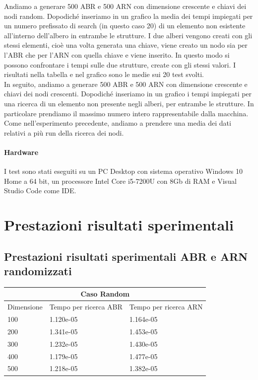 \documentclass[12pt]{article}
\begin{document}
Andiamo a generare 500 ABR e 500 ARN con dimensione crescente e chiavi dei nodi random.
Dopodiché inseriamo in un grafico la media dei tempi impiegati per un numero prefissato di search (in questo caso 20) di un elemento non esistente all'interno dell'albero in entrambe le strutture.
I due alberi vengono creati con gli stessi elementi, cioè una volta generata una chiave, viene creato un nodo sia per l'ABR che per l'ARN con quella chiave e viene inserito.
In questo modo si possono confrontare i tempi sulle due strutture, create con gli stessi valori.
I risultati nella tabella e nel grafico sono le medie sui 20 test svolti.\\
In seguito, andiamo a generare 500 ABR e 500 ARN con dimensione crescente e chiavi dei nodi crescenti.
Dopodiché inseriamo in un grafico i tempi impiegati per una ricerca di un elemento non presente negli alberi, per entrambe le strutture. In particolare prendiamo il massimo numero intero rappresentabile dalla macchina.\\
Come nell'esperimento precedente, andiamo a prendere una media dei dati relativi a più run della ricerca dei nodi.

\paragraph{Hardware}
I test sono stati eseguiti su un PC Desktop con sistema operativo Windows 10 Home a 64 bit, un processore Intel Core i5-7200U con 8Gb di RAM e Visual Studio Code come IDE.

\section{Prestazioni risultati sperimentali}
\subsection{Prestazioni risultati sperimentali ABR e ARN randomizzati}
\begin{center}
\begin{tabular}[]{ |p{3cm}||p{5cm}||p{5cm}| }
 \hline
 \multicolumn{3}{|c|}{Caso Random }\\
 \hline
 Dimensione & Tempo per ricerca ABR & Tempo per ricerca ARN \\
 \hline
100  &  1.120e-05  &  1.164e-05\\
200  &  1.341e-05  &  1.453e-05\\
300  &  1.232e-05  &  1.430e-05\\
400  &  1.179e-05  &  1.477e-05\\
500  &  1.218e-05  &  1.382e-05\\
 \hline
\end{tabular}
\end{center}
\end{document}
